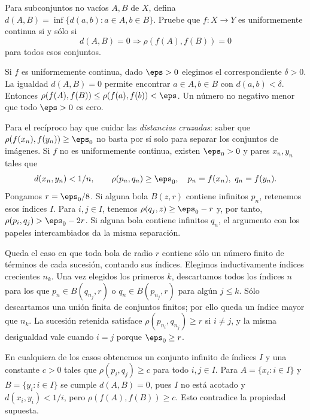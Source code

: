 \begin{ejercicio}\label{ej:lectura-7-6}
Para subconjuntos no vacíos $A,B$ de $X$, defina $d(A,B)=\inf\{d(a,b):a\in A,b\in B\}$. Pruebe que $f:X\to Y$ es uniformemente continua si y sólo si
\[
 d(A,B)=0\Longrightarrow\rho(f(A),f(B))=0
\]
para todos esos conjuntos.
\end{ejercicio}
\begin{solucion}
Si $f$ es uniformemente continua, dado $\eps>0$ elegimos el correspondiente $\delta>0$. La igualdad $d(A,B)=0$ permite encontrar $a\in A,b\in B$ con $d(a,b)<\delta$. Entonces $\rho(f(A),f(B))\leq\rho(f(a),f(b))<\eps$. Un número no negativo menor que todo $\eps>0$ es cero.

Para el recíproco hay que cuidar las \emph{distancias cruzadas}: saber que $\rho(f(x_n),f(y_n))\geq\eps_0$ no basta por sí solo para separar los conjuntos de imágenes. Si $f$ no es uniformemente continua, existen $\eps_0>0$ y pares $x_n,y_n$ tales que
\[
 d(x_n,y_n)<1/n,\qquad \rho(p_n,q_n)\geq\eps_0,
 \quad p_n=f(x_n),\ q_n=f(y_n).
\]
Pongamos $r=\eps_0/8$. Si alguna bola $B(z,r)$ contiene infinitos $p_n$, retenemos esos índices $I$. Para $i,j\in I$, tenemos $\rho(q_j,z)\geq\eps_0-r$ y, por tanto, $\rho(p_i,q_j)>\eps_0-2r$. Si alguna bola contiene infinitos $q_n$, el argumento con los papeles intercambiados da la misma separación.

Queda el caso en que toda bola de radio $r$ contiene sólo un número finito de términos de cada sucesión, contando sus índices. Elegimos inductivamente índices crecientes $n_k$. Una vez elegidos los primeros $k$, descartamos todos los índices $n$ para los que $p_n\in B(q_{n_j},r)$ o $q_n\in B(p_{n_j},r)$ para algún $j\leq k$. Sólo descartamos una unión finita de conjuntos finitos; por ello queda un índice mayor que $n_k$. La sucesión retenida satisface $\rho(p_{n_i},q_{n_j})\geq r$ si $i\ne j$, y la misma desigualdad vale cuando $i=j$ porque $\eps_0\geq r$.

En cualquiera de los casos obtenemos un conjunto infinito de índices $I$ y una constante $c>0$ tales que $\rho(p_i,q_j)\geq c$ para todo $i,j\in I$. Para $A=\{x_i:i\in I\}$ y $B=\{y_i:i\in I\}$ se cumple $d(A,B)=0$, pues $I$ no está acotado y $d(x_i,y_i)<1/i$, pero $\rho(f(A),f(B))\geq c$. Esto contradice la propiedad supuesta.
\end{solucion}

